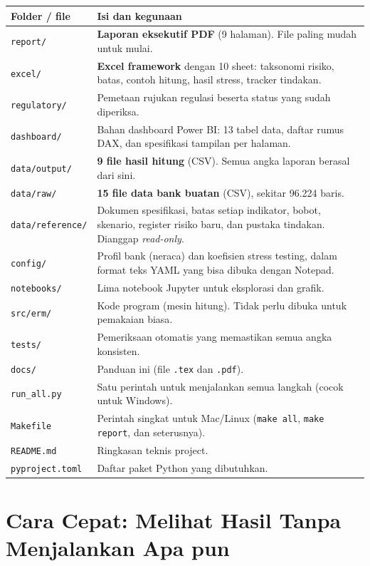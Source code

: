 \documentclass[11pt,a4paper]{article}
\newcommand{\file}[1]{\texttt{\small #1}}
\begin{document}
\begin{longtable}{>{\raggedright\arraybackslash}p{4.3cm}>{\raggedright\arraybackslash}p{10.6cm}}
\toprule
\textbf{Folder / file} & \textbf{Isi dan kegunaan}\\
\midrule
\endhead
\file{report/} & \textbf{Laporan eksekutif PDF} (9 halaman). File paling mudah untuk mulai. \\
\file{excel/} & \textbf{Excel framework} dengan 10 sheet: taksonomi risiko, batas, contoh hitung, hasil stress, tracker tindakan. \\
\file{regulatory/} & Pemetaan rujukan regulasi beserta status yang sudah diperiksa. \\
\file{dashboard/} & Bahan dashboard Power BI: 13 tabel data, daftar rumus DAX, dan spesifikasi tampilan per halaman. \\
\file{data/output/} & \textbf{9 file hasil hitung} (CSV). Semua angka laporan berasal dari sini. \\
\file{data/raw/} & \textbf{15 file data bank buatan} (CSV), sekitar 96.224 baris. \\
\file{data/reference/} & Dokumen spesifikasi, batas setiap indikator, bobot, skenario, register risiko baru, dan pustaka tindakan. Dianggap \emph{read-only}. \\
\file{config/} & Profil bank (neraca) dan koefisien stress testing, dalam format teks YAML yang bisa dibuka dengan Notepad. \\
\file{notebooks/} & Lima notebook Jupyter untuk eksplorasi dan grafik. \\
\file{src/erm/} & Kode program (mesin hitung). Tidak perlu dibuka untuk pemakaian biasa. \\
\file{tests/} & Pemeriksaan otomatis yang memastikan semua angka konsisten. \\
\file{docs/} & Panduan ini (file \file{.tex} dan \file{.pdf}). \\
\file{run\_\allowbreak{}all.py} & Satu perintah untuk menjalankan semua langkah (cocok untuk Windows). \\
\file{Makefile} & Perintah singkat untuk Mac/Linux (\file{make all}, \file{make report}, dan seterusnya). \\
\file{README.md} & Ringkasan teknis project. \\
\file{pyproject.toml} & Daftar paket Python yang dibutuhkan. \\
\bottomrule
\end{longtable}

\section{Cara Cepat: Melihat Hasil Tanpa Menjalankan Apa pun}\label{sec:quick}
\end{document}

